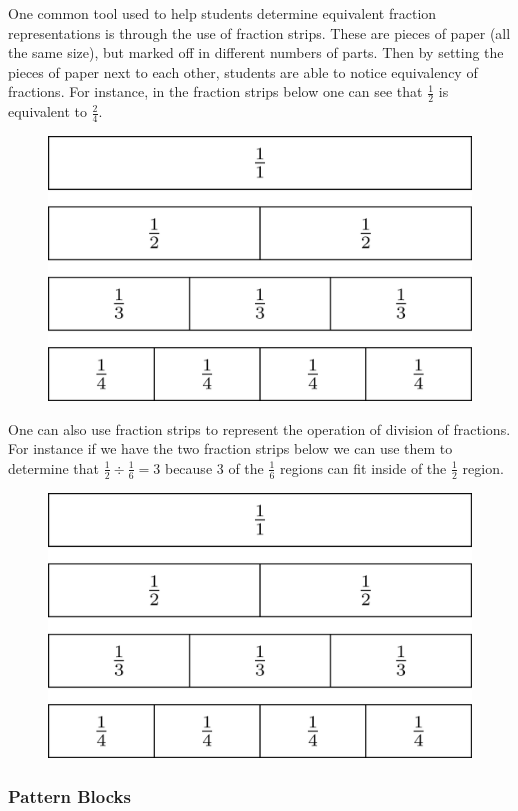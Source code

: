 \documentclass[
]{book}
\theoremstyle{definition}
\theoremstyle{definition}
\theoremstyle{definition}
\theoremstyle{definition}
\theoremstyle{remark}
\begin{document}
One common tool used to help students determine equivalent fraction representations is through the use of fraction strips. These are pieces of paper (all the same size), but marked off in different numbers of parts. Then by setting the pieces of paper next to each other, students are able to notice equivalency of fractions. For instance, in the fraction strips below one can see that \(\frac{1}{2}\) is equivalent to \(\frac{2}{4}\).

\begin{figure}

{\centering \includegraphics[width=0.6\linewidth]{tikz/fraction-strip1} 

}

\end{figure}

One can also use fraction strips to represent the operation of division of fractions. For instance if we have the two fraction strips below we can use them to determine that \(\frac{1}{2} \div \frac{1}{6} = 3\) because \(3\) of the \(\frac{1}{6}\) regions can fit inside of the \(\frac{1}{2}\) region.

\begin{figure}

{\centering \includegraphics[width=0.6\linewidth]{tikz/fraction-strip1} 

}

\end{figure}

\hypertarget{pattern-blocks}{%
\subsubsection{Pattern Blocks}\label{pattern-blocks}}
\end{document}
